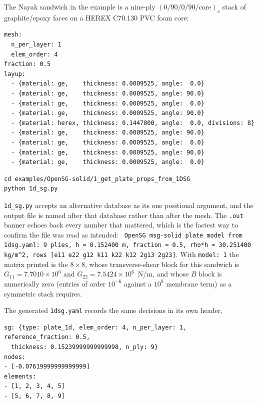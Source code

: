 The Nayak sandwich in the example is a nine-ply $(0/90/0/90/\text{core})_s$ stack
of graphite/epoxy faces on a HEREX C70.130 PVC foam core:

\begin{lstlisting}[style=shellst,caption={The mesh, reference and stacking blocks of layup\_db.yaml.}]
mesh:
  n_per_layer: 1
  elem_order: 4
fraction: 0.5
layup:
  - {material: ge,    thickness: 0.0009525, angle:  0.0}
  - {material: ge,    thickness: 0.0009525, angle: 90.0}
  - {material: ge,    thickness: 0.0009525, angle:  0.0}
  - {material: ge,    thickness: 0.0009525, angle: 90.0}
  - {material: herex, thickness: 0.1447800, angle:  0.0, divisions: 8}
  - {material: ge,    thickness: 0.0009525, angle: 90.0}
  - {material: ge,    thickness: 0.0009525, angle:  0.0}
  - {material: ge,    thickness: 0.0009525, angle: 90.0}
  - {material: ge,    thickness: 0.0009525, angle:  0.0}
\end{lstlisting}

\begin{lstlisting}[style=shellst]
cd examples/OpenSG-solid/1_get_plate_props_from_1DSG
python 1d_sg.py
\end{lstlisting}

\texttt{1d\_sg.py} accepts an alternative database as its one positional
argument, and the output file is named after that database rather than after the
mesh. The \texttt{.out} banner echoes back every number that mattered, which is
the fastest way to confirm the file was read as intended:
\texttt{ OpenSG msg-solid plate model from 1dsg.yaml: 9 plies, h = 0.152400 m,
fraction = 0.5, rho*h = 30.251400 kg/m\^{}2, rows [e11 e22 g12 k11 k22 k12 2g13
2g23]}. With \texttt{model: 1} the matrix printed is the $8\times8$, whose
transverse-shear block for this sandwich is $G_{11} = 7.7010\times10^{6}$ and
$G_{22} = 7.5424\times10^{6}$~N/m, and whose $B$ block is numerically zero
(entries of order $10^{-6}$ against a $10^{8}$ membrane term) as a symmetric
stack requires.

The generated \texttt{1dsg.yaml} records the same decisions in its own header,

\begin{lstlisting}[style=shellst,caption={Header, first node and first elements of the generated 1dsg.yaml (37 node rows and 9 element rows in full).}]
sg: {type: plate_1d, elem_order: 4, n_per_layer: 1, reference_fraction: 0.5,
  thickness: 0.15239999999999998, n_ply: 9}
nodes:
- [-0.07619999999999999]
elements:
- [1, 2, 3, 4, 5]
- [5, 6, 7, 8, 9]
\end{lstlisting}

